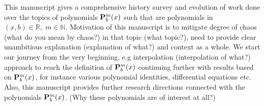This manuscript gives a comprehensive history survey and evolution of work done over the topics of
polynomials ${\mathbf{P}}\sp{m} \sb{b}(x)$ such that are polynomials in $(x,b)\in\mathbb{R}, \; m\in\mathbb{N}$.
Motivation of this manuscript is to mitigate degree of chaos (what do you mean by chaos?) in that topic (what topic?),
need to provide clear unambitious explanation (explanation of what?) and context as a whole.
We start our journey from the very beginning, e.g interpolation (interpolation of what?) approach to
reach the definition of ${\mathbf{P}}\sp{m} \sb{b}(x)$
continuing further with results based on ${\mathbf{P}}\sp{m} \sb{b}(x)$,
for instance various polynomial identities, differential equations etc.
Also, this manuscript provides further research directions connected with the polynomials ${\mathbf{P}}\sp{m} \sb{b}(x)$.
(Why these polynomials are of interest at all?)
